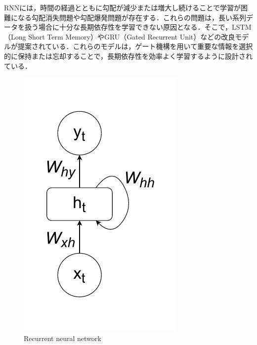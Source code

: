 RNNには，時間の経過とともに勾配が減少または増大し続けることで学習が困難になる勾配消失問題\cite{hochreiter2001gradient-grad,weinleindiplomarbeit-grad,schmidhuber2015deep-grad}や勾配爆発問題が存在する．これらの問題は，長い系列データを扱う場合に十分な長期依存性を学習できない原因となる．そこで，LSTM（Long Short Term Memory）\cite{hochreiter1997long}やGRU（Gated Recurrent Unit）\cite{chung2014empirical-gru}などの改良モデルが提案されている．これらのモデルは，ゲート機構を用いて重要な情報を選択的に保持または忘却することで，長期依存性を効率よく学習するように設計されている．
\begin{figure}[hbtp]
  \centering
 \includegraphics[keepaspectratio, scale=0.52]
      {images/neural-network-rnn.pdf}
 \caption{Recurrent neural network}
 \label{Fig:rnn}
\end{figure}   

\newpage
